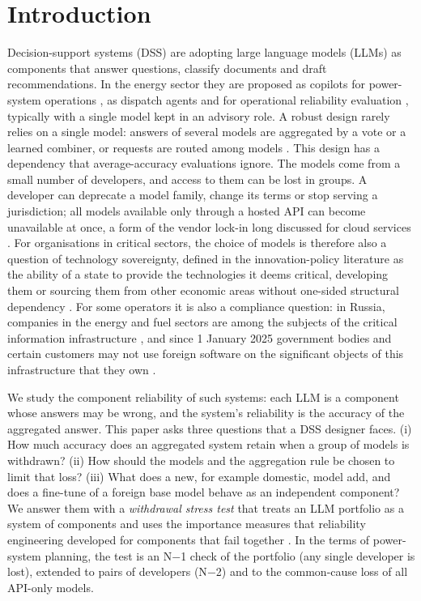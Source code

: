 \documentclass[preprint,12pt,authoryear]{elsarticle}
\begin{document}
\section{Introduction}

Decision-support systems (DSS) are adopting large language models (LLMs) as components that answer questions, classify documents and draft recommendations. In the energy sector they are proposed as copilots for power-system operations \citep{sulaima2026trustworthy}, as dispatch agents \citep{zhao2026dispatch} and for operational reliability evaluation \citep{cheng2026reliability}, typically with a single model kept in an advisory role. A robust design rarely relies on a single model: answers of several models are aggregated by a vote or a learned combiner, or requests are routed among models \citep{jiang2023blender,wang2025moa,chen2024frugalgpt,ong2025routellm}. This design has a dependency that average-accuracy evaluations ignore. The models come from a small number of developers, and access to them can be lost in groups. A developer can deprecate a model family, change its terms or stop serving a jurisdiction; all models available only through a hosted API can become unavailable at once, a form of the vendor lock-in long discussed for cloud services \citep{oparamartins2016}. For organisations in critical sectors, the choice of models is therefore also a question of technology sovereignty, defined in the innovation-policy literature as the ability of a state to provide the technologies it deems critical, developing them or sourcing them from other economic areas without one-sided structural dependency \citep{edler2023}. For some operators it is also a compliance question: in Russia, companies in the energy and fuel sectors are among the subjects of the critical information infrastructure \citep{fz187}, and since 1 January 2025 government bodies and certain customers may not use foreign software on the significant objects of this infrastructure that they own \citep{ukaz166}.

We study the component reliability of such systems: each LLM is a component whose answers may be wrong, and the system's reliability is the accuracy of the aggregated answer. This paper asks three questions that a DSS designer faces. (i) How much accuracy does an aggregated system retain when a group of models is withdrawn? (ii) How should the models and the aggregation rule be chosen to limit that loss? (iii) What does a new, for example domestic, model add, and does a fine-tune of a foreign base model behave as an independent component? We answer them with a \emph{withdrawal stress test} that treats an LLM portfolio as a system of components and uses the importance measures that reliability engineering developed for components that fail together \citep{birnbaum1969,vesely1983,borgonovo2001,honglie1993}. In the terms of power-system planning, the test is an N$-$1 check of the portfolio (any single developer is lost), extended to pairs of developers (N$-$2) and to the common-cause loss of all API-only models.
\end{document}
